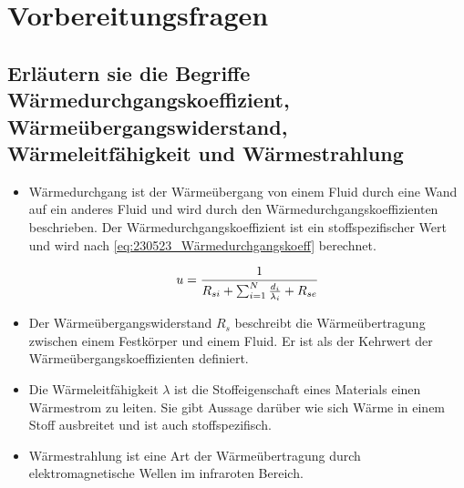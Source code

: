 \section{Vorbereitungsfragen}
\subsection{Erläutern sie die Begriffe Wärmedurchgangskoeffizient, Wärmeübergangswiderstand, Wärmeleitfähigkeit und Wärmestrahlung}

\begin{itemize}
\item Wärmedurchgang ist der Wärmeübergang von einem Fluid durch eine Wand auf ein anderes Fluid und wird durch den Wärmedurchgangskoeffizienten beschrieben. Der Wärmedurchgangskoeffizient ist ein stoffspezifischer Wert und wird nach \autoref{eq:230523_Wärmedurchgangskoeff} berechnet. 
 
\begin{equation}
	\centering
	u=\frac{1}{R_{si}+\sum_{i=1}^N \frac{d_i}{\lambda_i}+R_{se}}
	\label{eq:230523_Wärmedurchgangskoeff}
\end{equation}

\item Der Wärmeübergangswiderstand $R_s$ beschreibt die Wärmeübertragung zwischen einem Festkörper und einem Fluid. Er ist als der Kehrwert der Wärmeübergangskoeffizienten definiert.

\item Die Wärmeleitfähigkeit $\lambda$ ist die Stoffeigenschaft eines Materials einen Wärmestrom zu leiten. Sie gibt Aussage darüber wie sich Wärme in einem Stoff ausbreitet und ist auch stoffspezifisch.

\item Wärmestrahlung ist eine Art der Wärmeübertragung durch elektromagnetische Wellen im infraroten Bereich.

\end{itemize}




